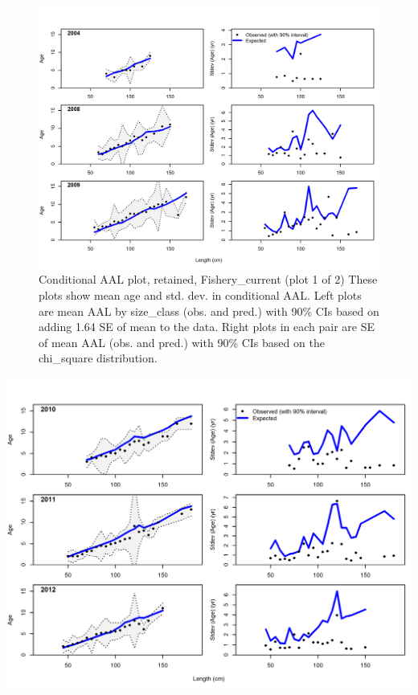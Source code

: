 \documentclass[12pt,]{article}
\begin{document}
\FloatBarrier

\begin{figure}
\centering
\includegraphics{./r4ss/plots_mod1/comp_condAALfit_Andre_plotsflt1mkt2_page1.png}
\caption{Conditional AAL plot, retained, Fishery\_current (plot 1 of 2)
These plots show mean age and std. dev. in conditional AAL. Left plots
are mean AAL by size\_class (obs. and pred.) with 90\% CIs based on
adding 1.64 SE of mean to the data. Right plots in each pair are SE of
mean AAL (obs. and pred.) with 90\% CIs based on the chi\_square
distribution.
\label{fig:mod1_4_comp_condAALfit_Andre_plotsflt1mkt2_page1}}
\end{figure}

\includegraphics{./r4ss/plots_mod1/comp_condAALfit_Andre_plotsflt1mkt2_page2.png}
\end{document}
